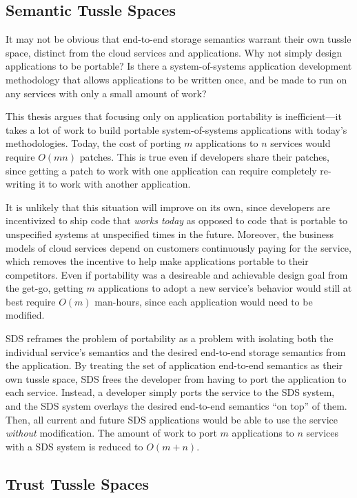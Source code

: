 \subsection{Semantic Tussle Spaces}

It may not be obvious that end-to-end storage semantics warrant their own tussle
space, distinct from the cloud services and applications.  Why not simply
design applications to be portable?  Is there a system-of-systems application
development methodology that allows applications to be written once, and be made
to run on any services with only a small amount of work?

This thesis argues that focusing only on application portability is
inefficient---it takes a lot of work to build portable system-of-systems
applications with today's methodologies.
Today, the cost of porting $m$ applications to $n$ services
would require $O(mn)$ patches.  This is true even if developers share their
patches, since getting a patch to work with one application can require completely
re-writing it to work with another application.

It is unlikely that this situation will improve on its own,
since developers are incentivized to ship code that \emph{works
today} as opposed to code that is portable to unspecified systems at unspecified
times in the future.  Moreover, the business models of cloud services
depend on customers continuously paying for the service, which removes the
incentive to help make applications portable to their competitors.
Even if portability was a desireable and achievable design goal from the get-go,
getting $m$ applications to adopt a new service's behavior would still at best
require $O(m)$ man-hours, since each application would need to be modified.

SDS reframes the problem of portability as a problem with isolating
both the individual service's semantics and the desired end-to-end storage
semantics from the application.  By treating the set of application
end-to-end semantics as their own tussle space, SDS frees the developer from
having to port the application to each service.  Instead, a developer simply
ports the service to the SDS system, and the SDS system overlays the desired
end-to-end semantics ``on top'' of them.  Then, all current and future SDS
applications would be able to use the service \emph{without} modification.
The amount of work to port $m$ applications to $n$ services with a SDS system is reduced to
$O(m+n)$.

\subsection{Trust Tussle Spaces}

